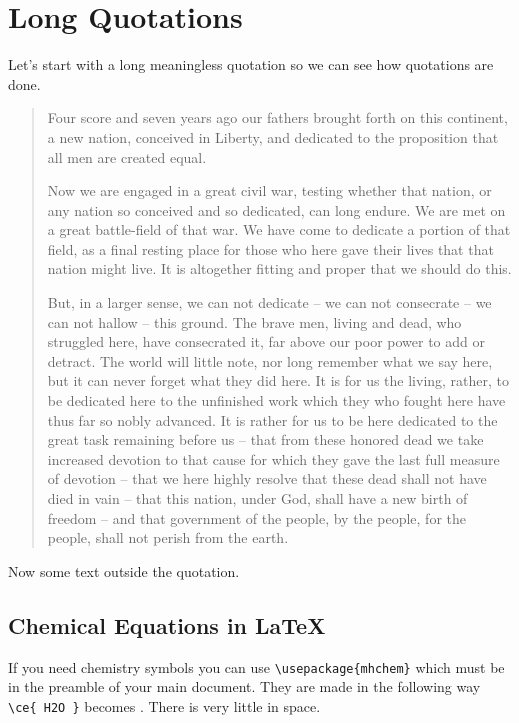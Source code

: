 \chapter{Long Quotations}
Let's start with a long meaningless quotation so we can see how quotations are done.

\begin{quotation}
	Four score and seven years ago our fathers brought forth on this continent, a new nation, conceived in Liberty, and dedicated to the proposition that all men are created equal.
	
	Now we are engaged in a great civil war, testing whether that nation, or any nation so conceived and so dedicated, can long endure. We are met on a great battle-field of that war. We have come to dedicate a portion of that field, as a final resting place for those who here gave their lives that that nation might live. It is altogether fitting and proper that we should do this.
	
	But, in a larger sense, we can not dedicate -- we can not consecrate -- we can not hallow -- this ground. The brave men, living and dead, who struggled here, have consecrated it, far above our poor power to add or detract. The world will little note, nor long remember what we say here, but it can never forget what they did here. It is for us the living, rather, to be dedicated here to the unfinished work which they who fought here have thus far so nobly advanced. It is rather for us to be here dedicated to the great task remaining before us -- that from these honored dead we take increased devotion to that cause for which they gave the last full measure of devotion -- that we here highly resolve that these dead shall not have died in vain -- that this nation, under God, shall have a new birth of freedom -- and that government of the people, by the people, for the people, shall not perish from the earth.
\end{quotation} 
Now some text outside the quotation.
\section{Chemical Equations in \LaTeX}
If you need chemistry symbols you can use
\verb|\usepackage{mhchem}| which must be in the preamble of your main document.
They are made in the following way \verb|\ce{ H2O }| becomes .
There is very little  in space.  
